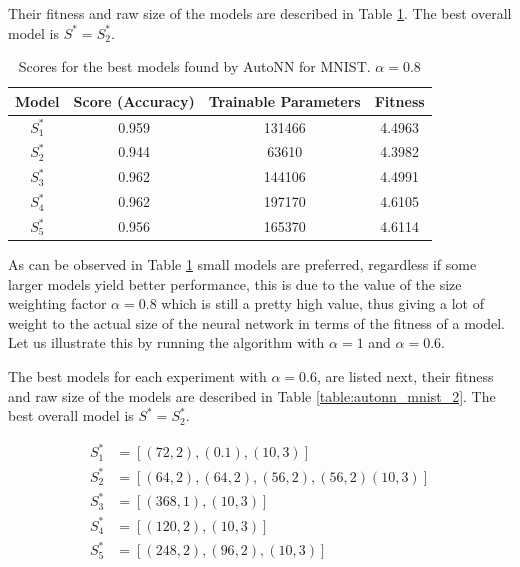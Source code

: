 \documentclass[journal]{IEEEtran}
\begin{document}
Their fitness and raw size of the models are described in Table \ref{table:autonn_mnist_1}. The best overall model is $S^* = S^*_2$.

\begin{table}[!htb]
\begin{center}
\begin{tabular}{| c | c | c | c |}
\hline
Model & Score (Accuracy) & Trainable Parameters & Fitness\\
\hline
$S^*_1$ & 0.959 & 131466 & 4.4963\\
$S^*_2$ & 0.944 & 63610 & 4.3982\\
$S^*_3$ & 0.962 & 144106 & 4.4991\\
$S^*_4$ & 0.962 & 197170 & 4.6105\\
$S^*_5$ & 0.956 & 165370 & 4.6114\\
\hline
\end{tabular}
\end{center}
\caption{Scores for the best models found by AutoNN for MNIST. $\alpha = 0.8$}
\label{table:autonn_mnist_1}
\end{table}

As can be observed in Table \ref{table:autonn_mnist_1} small models are preferred, regardless if some larger models yield better performance, this is due to the value of the size weighting factor $\alpha = 0.8$ which is still a pretty high value, thus giving a lot of weight to the actual size of the neural network in terms of the fitness of a model. Let us illustrate this by running the algorithm with $\alpha = 1$ and $\alpha = 0.6$.

The best models for each experiment with $\alpha = 0.6$, are listed next, their fitness and raw size of the models are described in Table \ref{table:autonn_mnist_2}. The best overall model is $S^* = S^*_2$.

\begin{align*}
S^*_1 & = \left[ (72, 2), (0.1), (10, 3) \right] \\
S^*_2 & = \left[ (64, 2), (64,2), (56,2), (56,2) (10, 3) \right] \\
S^*_3 & = \left[ (368, 1), (10, 3) \right] \\
S^*_4 & = \left[ (120, 2),  (10, 3) \right] \\
S^*_5 & = \left[ (248, 2), (96, 2), (10, 3) \right] \\
\end{align*}
\end{document}
